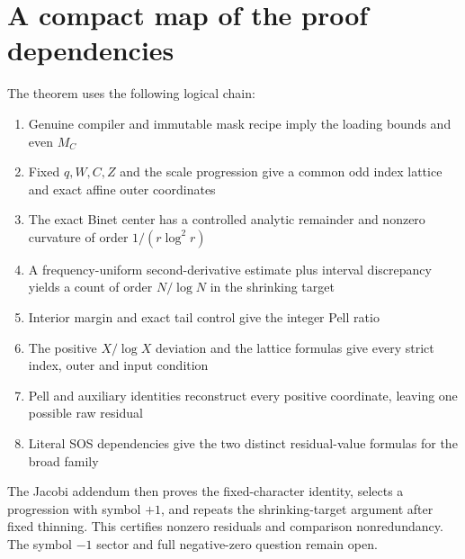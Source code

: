\documentclass[11pt,letterpaper]{article}
\theoremstyle{definition}\newtheorem{definition}[theorem]{Definition}
\theoremstyle{remark}\newtheorem{remark}[theorem]{Remark}
\newcommand{\MC}{M_C}
\begin{document}
\section{A compact map of the proof dependencies}
The theorem uses the following logical chain:
\begin{enumerate}
\item Genuine compiler and immutable mask recipe imply the loading bounds and even $\MC$
\item Fixed $q,W,C,Z$ and the scale progression give a common odd index lattice and exact affine outer coordinates
\item The exact Binet center has a controlled analytic remainder and nonzero curvature of order $1/(r\log^2r)$
\item A frequency-uniform second-derivative estimate plus interval discrepancy yields a count of order $N/\log N$ in the shrinking target
\item Interior margin and exact tail control give the integer Pell ratio
\item The positive $X/\log X$ deviation and the lattice formulas give every strict index, outer and input condition
\item Pell and auxiliary identities reconstruct every positive coordinate, leaving one possible raw residual
\item Literal SOS dependencies give the two distinct residual-value formulas for the broad family
\end{enumerate}
The Jacobi addendum then proves the fixed-character identity, selects a progression with symbol $+1$, and repeats the shrinking-target argument after fixed thinning. This certifies nonzero residuals and comparison nonredundancy. The symbol $-1$ sector and full negative-zero question remain open.
\end{document}
